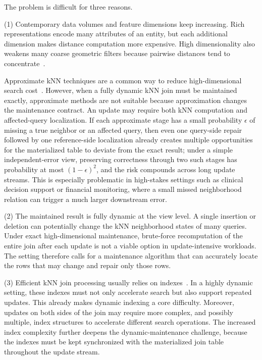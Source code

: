 The problem is difficult for three reasons.

\noindent(1) Contemporary data volumes and feature dimensions keep increasing. Rich representations encode many attributes of an entity, but each additional dimension makes distance computation more expensive. High dimensionality also weakens many coarse geometric filters because pairwise distances tend to concentrate~\cite{beyer1999nearest,kouiroukidis2011effects,gao2023high,zhao2023towards}.

Approximate kNN techniques are a common way to reduce high-dimensional search cost~\cite{bawa2005lsh,andoni2008near,jegou2010product,muja2014scalable,li2019approximate,gao2023high,zhao2023towards}. However, when a fully dynamic kNN join must be maintained exactly, approximate methods are not suitable because approximation changes the maintenance contract. An update may require both kNN computation and affected-query localization. If each approximate stage has a small probability $\epsilon$ of missing a true neighbor or an affected query, then even one query-side repair followed by one reference-side localization already creates multiple opportunities for the materialized table to deviate from the exact result; under a simple independent-error view, preserving correctness through two such stages has probability at most $(1-\epsilon)^2$, and the risk compounds across long update streams. This is especially problematic in high-stakes settings such as clinical decision support or financial monitoring, where a small missed neighborhood relation can trigger a much larger downstream error.

\noindent(2) The maintained result is fully dynamic at the view level. A single insertion or deletion can potentially change the kNN neighborhood states of many queries. Under exact high-dimensional maintenance, brute-force recomputation of the entire join after each update is not a viable option in update-intensive workloads. The setting therefore calls for a maintenance algorithm that can accurately locate the rows that may change and repair only those rows.

\noindent(3) Efficient kNN join processing usually relies on indexes~\cite{bohm2001cost,bohm2004k,xia2004gorder,yu2007efficient}. In a highly dynamic setting, these indexes must not only accelerate search but also support repeated updates. This already makes dynamic indexing a core difficulty. Moreover, updates on both sides of the join may require more complex, and possibly multiple, index structures to accelerate different search operations. The increased index complexity further deepens the dynamic-maintenance challenge, because the indexes must be kept synchronized with the materialized join table throughout the update stream.

